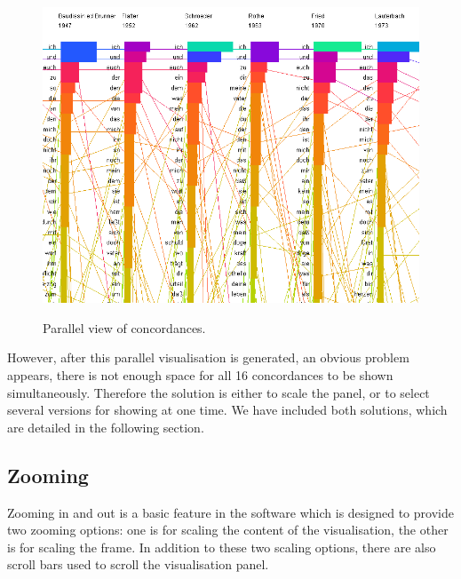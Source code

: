 \begin{figure}[H]
	\centering	
	\includegraphics[scale=0.6]{Figs/Parallel-Vis}\\[1ex]
	\caption{Parallel view of concordances.}
	\label{fig:parallelConcor}
\end{figure} 


However, after this parallel visualisation is generated, an obvious problem appears, there is not enough space for all 16 concordances to be shown simultaneously. Therefore the solution is either to scale the panel, or to select several versions for showing at one time. We have included both solutions, which are detailed in the following section. 

\subsection{Zooming}

Zooming in and out is a basic feature in the software which is designed to provide two zooming options: one is for scaling the content of the visualisation, the other is for scaling the frame. In addition to these two scaling options, there are also scroll bars used to scroll the visualisation panel.

